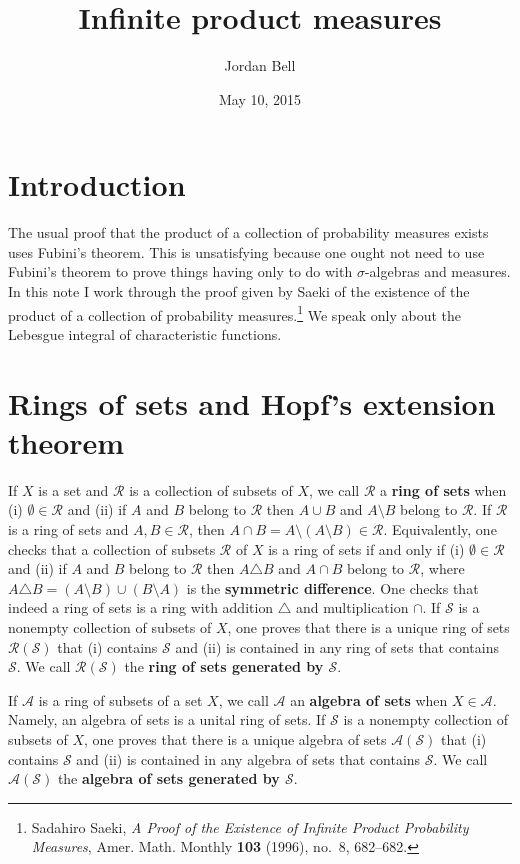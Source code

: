 \documentclass{article}
\theoremstyle{definition}
\theoremstyle{definition}
\begin{document}
\title{Infinite product measures}
\author{Jordan Bell}
\date{May 10, 2015}

\maketitle

\section{Introduction}
The usual proof that the product of a collection of probability measures exists uses Fubini's theorem. This is unsatisfying because one ought not need to use Fubini's theorem
to prove things having only to do with $\sigma$-algebras and measures. In this note I work through the proof given by Saeki of the existence of the product of a collection
of probability measures.\footnote{Sadahiro Saeki, {\em A Proof of the Existence of Infinite Product Probability Measures}, Amer. Math. Monthly \textbf{103} (1996), no.~8, 682--682.}
 We  speak only about the Lebesgue integral of characteristic functions.

\section{Rings of sets and Hopf's extension theorem}
If $X$ is a set and $\mathscr{R}$ is a collection of subsets of $X$, we call $\mathscr{R}$ a \textbf{ring of sets} when
(i) $\emptyset \in \mathscr{R}$ and (ii) if $A$ and $B$ belong to $\mathscr{R}$ then $A \cup B$ and $A \setminus B$ belong to $\mathscr{R}$.
If $\mathscr{R}$ is a ring of sets and $A, B \in \mathscr{R}$, then $A \cap B = A \setminus (A \setminus B) \in \mathscr{R}$. Equivalently, one checks
that a collection of subsets $\mathscr{R}$ of $X$ is a ring of sets if and only if (i) $\emptyset \in \mathscr{R}$ and (ii) if
$A$ and $B$ belong to $\mathscr{R}$ then $A \triangle B$ and $A \cap B$ belong to $\mathscr{R}$, where
$A \triangle B = (A \setminus B) \cup (B \setminus A)$ is the \textbf{symmetric difference}. One checks that
indeed a ring of sets is a ring with addition $\triangle$ and multiplication $\cap$.
If $\mathscr{S}$ is a nonempty collection of subsets of $X$, one proves that there is a unique ring of sets $\mathscr{R}(\mathscr{S})$ 
that (i) contains $\mathscr{S}$  and (ii) is contained in any ring of sets that contains $\mathscr{S}$. We call $\mathscr{R}(\mathscr{S})$ the \textbf{ring
of sets generated by $\mathscr{S}$}.

If $\mathscr{A}$ is a ring of subsets of a set $X$, we call $\mathscr{A}$ an \textbf{algebra of sets} when $X \in \mathscr{A}$. Namely, an algebra of sets is a unital
ring of sets. If $\mathscr{S}$ is a nonempty collection of subsets of $X$, one proves that there is a unique algebra of sets
$\mathscr{A}(\mathscr{S})$ that (i) contains $\mathscr{S}$ and (ii) is contained in any algebra of sets that contains $\mathscr{S}$. We call
$\mathscr{A}(\mathscr{S})$ the \textbf{algebra of sets generated by $\mathscr{S}$}.
\end{document}
